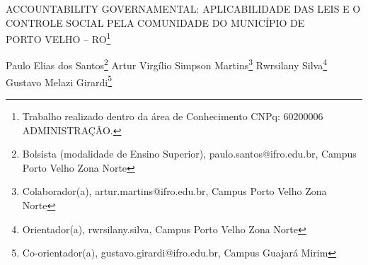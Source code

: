 \documentclass[article,12pt,onesidea,4paper,english,brazil]{abntex2}
\begin{document}
	
	
	\frenchspacing 
	
	\begin{center}
		\LARGE ACCOUNTABILITY GOVERNAMENTAL: APLICABILIDADE DAS LEIS E O CONTROLE SOCIAL PELA COMUNIDADE DO MUNICÍPIO DE\\PORTO VELHO -- RO\footnote{Trabalho realizado dentro da área de Conhecimento CNPq: 60200006 ADMINISTRAÇÃO.}
		
		\normalsize
		Paulo Elias dos Santos\footnote{Bolsista (modalidade de Ensino Superior), paulo.santos@ifro.edu.br, Campus Porto Velho Zona Norte} 
		Artur Virgílio Simpson Martins\footnote{Colaborador(a), artur.martins@ifro.edu.br, Campus Porto Velho Zona Norte} 
		Rwrsilany Silva\footnote{Orientador(a), rwrsilany.silva, Campus Porto Velho Zona Norte} 
		Gustavo Melazi Girardi\footnote{Co-orientador(a), gustavo.girardi@ifro.edu.br, Campus Guajará Mirim} 
	\end{center}
	
\end{document}

